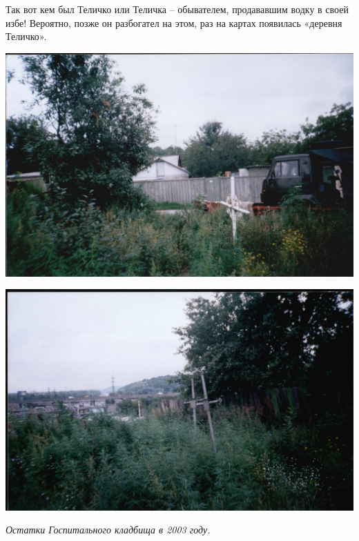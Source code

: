 Так вот кем был Теличко или Теличка – обывателем, продававшим водку в своей избе! Вероятно, позже он разбогател на этом, раз на картах появилась «деревня Теличко».

\newpage
\vspace*{\fill}
\begin{center}
\includegraphics[width=\linewidth]{chast-vosp/zver/out0023.jpg}
\end{center}

\begin{center}
\includegraphics[width=\linewidth]{chast-vosp/zver/out0024.jpg}
\end{center}

\textit{Остатки Госпитального кладбища в 2003 году.}
\vspace*{\fill}
\newpage


